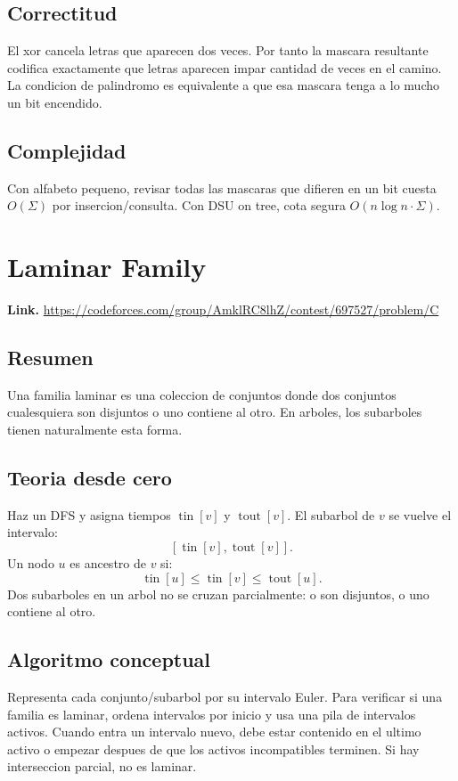 \documentclass[10pt]{article}
\newcommand{\bigO}{O}
\newcommand{\tin}{\operatorname{tin}}
\newcommand{\tout}{\operatorname{tout}}
\begin{document}
\subsection*{Correctitud}
El xor cancela letras que aparecen dos veces. Por tanto la mascara resultante
codifica exactamente que letras aparecen impar cantidad de veces en el camino.
La condicion de palindromo es equivalente a que esa mascara tenga a lo mucho un
bit encendido.

\subsection*{Complejidad}
Con alfabeto pequeno, revisar todas las mascaras que difieren en un bit cuesta
$\bigO(\Sigma)$ por insercion/consulta. Con DSU on tree, cota segura
$\bigO(n\log n\cdot \Sigma)$.

\clearpage
\section{Laminar Family}
\textbf{Link.} \url{https://codeforces.com/group/AmklRC8lhZ/contest/697527/problem/C}

\subsection*{Resumen}
Una familia laminar es una coleccion de conjuntos donde dos conjuntos
cualesquiera son disjuntos o uno contiene al otro. En arboles, los subarboles
tienen naturalmente esta forma.

\subsection*{Teoria desde cero}
Haz un DFS y asigna tiempos $\tin[v]$ y $\tout[v]$. El subarbol de $v$ se vuelve
el intervalo:
\[
[\tin[v],\tout[v]].
\]
Un nodo $u$ es ancestro de $v$ si:
\[
\tin[u]\le \tin[v]\le \tout[u].
\]
Dos subarboles en un arbol no se cruzan parcialmente: o son disjuntos, o uno
contiene al otro.

\subsection*{Algoritmo conceptual}
Representa cada conjunto/subarbol por su intervalo Euler. Para verificar si una
familia es laminar, ordena intervalos por inicio y usa una pila de intervalos
activos. Cuando entra un intervalo nuevo, debe estar contenido en el ultimo
activo o empezar despues de que los activos incompatibles terminen. Si hay
interseccion parcial, no es laminar.
\end{document}
